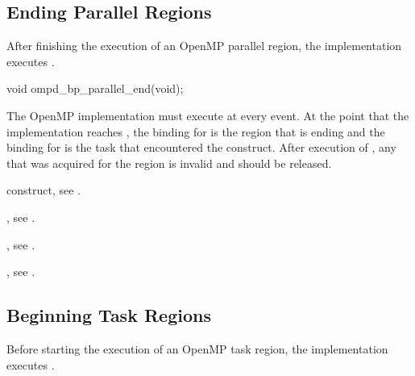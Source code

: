 \subsection{Ending Parallel Regions}
\label{subsubsec:ompd_bp_parallel_end}

\summary
After finishing the execution of an OpenMP parallel region, 
the implementation executes .

\format
\begin{cspecific}
\begin{ompSyntax}
void ompd_bp_parallel_end(void);
\end{ompSyntax}
\end{cspecific}


\descr
The OpenMP implementation must execute  at 
every  event. At the point that the implementation reaches 
, the binding for  
is the  region that is ending and the binding for 
 is the task that encountered the 
 construct. After execution of , any 
 that was acquired for the  region is 
invalid and should be released.

\begin{crossrefs}
\item {} construct, see .

\item {}, 
see .

\item {}, 
see .

\item {}, 
see .
\end{crossrefs}



\subsection{Beginning Task Regions}
\label{subsubsec:ompd_bp_task_begin}

\summary
Before starting the execution of an OpenMP task region, 
the implementation executes .

